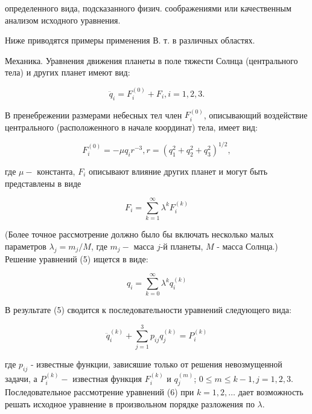 \documentclass[10pt]{article}
\begin{document}
определенного вида, подсказанного физич. соображениями или качественным анализом исходного уравнения.



Ниже приводятся примеры применения В. т. в различных областях.



Механика. Уравнения движения планеты в поле тяжести Солнца (центрального тела) и других планет имеют вид:



\[

\ddot{q}_{i}=F_{i}^{(0)}+F_{i}, i=1,2,3 .

\]



В пренебрежении размерами небесных тел член $F_{i}^{(0)}$, описывающий воздействие центрального (расположенного в начале координат) тела, имеет вид:



\[

F_{i}^{(0)}=-\mu q_{i} r^{-3}, r=\left(q_{1}^{2}+q_{2}^{2}+q_{3}^{2}\right)^{1 / 2},

\]



где $\mu-$ константа, $F_{i}$ описывают влияние других планет и могут быть представлены в виде



\[

F_{i}=\sum_{k=1}^{\infty} \lambda^{k} F_{i}^{(k)}

\]



(Более точное рассмотрение должно было бы включать несколько малых параметров $\lambda_{j}=m_{j} / M$, где $m_{j}-$ масса $j$-й планеты, $M$ - масса Солнца.) Решение уравнений (5) ищется в виде:



\[

q_{i}=\sum_{k=0}^{\infty} \lambda^{k} q_{i}^{(k)}

\]



В результате (5) сводится к последовательности уравнений следующего вида:



\[

\ddot{q}_{i}^{(k)}+\sum_{j=1}^{3} p_{i j} q_{j}^{(k)}=P_{i}^{(k)}

\]



где $p_{i j}$ - известные функции, зависяшие только от решения невозмущенной задачи, а $P_{i}^{(k)}-$ известная функция $F_{i}^{(k)}$ и $q_{j}^{(m)}$; $0 \leqslant m \leqslant k-1, j=1,2,3$. Последовательное рассмотрение уравнений (6) при $k=1,2, \ldots$ дает возможность решать исходное уравнение в произвольном порядке разложения по $\lambda$.
\end{document}
